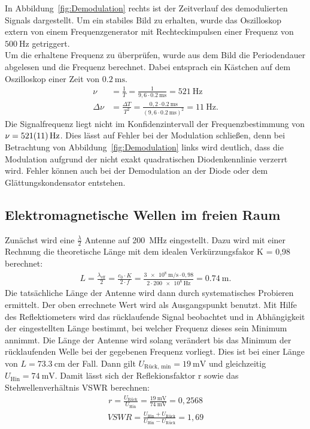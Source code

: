 \documentclass[a4paper,twoside,final]{article}
\begin{document}
In Abbildung~\ref{fig:Demodulation} rechts ist der Zeitverlauf des demodulierten Signals dargestellt. Um ein stabiles Bild zu erhalten, wurde das Oszilloskop extern von einem Frequenzgenerator mit Rechteckimpulsen einer Frequenz von $\SI{500}{\hertz}$ getriggert.\\
Um die erhaltene Frequenz zu überprüfen, wurde aus dem Bild die Periodendauer abgelesen und die Frequenz berechnet. Dabei entsprach ein Kästchen auf dem Oszilloskop einer Zeit von $\SI{0,2}{\milli\second}$.
\begin{align}
  \nu &= \frac{1}{T} = \frac{1}{9,6\cdot \SI{0,2}{\milli\second}} = \SI{521}{\hertz}\\
  \Delta \nu &= \frac{\Delta T}{T^2} = \frac{0,2\cdot \SI{0,2}{\milli\second}}{(9,6\cdot \SI{0,2}{\milli\second})^2} = \SI{11}{\hertz}.
\end{align}
Die Signalfrequenz liegt nicht im Konfidenzintervall der Frequenzbestimmung von $\nu = \SI{521\pm 11}{\hertz}$. Dies lässt auf Fehler bei der Modulation schließen, denn bei Betrachtung von Abbildung~\ref{fig:Demodulation} links wird deutlich, dass die Modulation aufgrund der nicht exakt quadratischen Diodenkennlinie verzerrt wird. Fehler können auch bei der Demodulation an der Diode oder dem Glättungskondensator entstehen.

\subsection{Elektromagnetische Wellen im freien Raum}
Zunächst wird eine $\frac{\lambda}{2}$ Antenne auf \SI{200}{\mega\hertz} eingestellt. Dazu wird mit einer Rechnung die theoretische Länge mit dem idealen Verkürzungsfakor K = 0,98 berechnet:
\begin{align}
L = \frac{\lambda_\text{eff}}{2} = \frac{c_0 \cdot K}{2 \cdot f} = \frac{\SI{3e8}{\metre\per\second} \cdot 0,98}{2 \cdot \SI{200e8}{\hertz}}  = \SI{0,74}{\metre}.
\end{align}
Die tatsächliche Länge der Antenne wird dann durch systematisches Probieren ermittelt. Der oben errechnete Wert wird als Ausgangspunkt benutzt. Mit Hilfe des Reflektiometers wird das rücklaufende Signal beobachtet und in Abhängigkeit der eingestellten Länge bestimmt, bei welcher Frequenz dieses sein Minimum annimmt. Die Länge der Antenne wird solang verändert bis das Minimum der rücklaufenden Welle bei der gegebenen Frequenz vorliegt. Dies ist bei einer Länge von $L = \SI{73,3}{\centi\metre}$ der Fall. Dann gilt $U_\text{Rück, min} = \SI{19}{\milli\volt}$ und gleichzeitig $U_\text{Hin} = \SI{74}{\milli\volt}$. Damit lässt sich der Reflekionsfaktor r sowie das Stehwellenverhältnis VSWR berechnen:
\begin{align}
r = \frac{U_\text{Rück}}{U_\text{Hin}} = \frac{\SI{19}{\milli\volt}}{\SI{74}{\milli\volt}} = 0,2568
\end{align}
\begin{align}
VSWR = \frac{U_\text{Hin}+U_\text{Rück}}{U_\text{Hin}-U_\text{Rück}} = 1,69
\end{align}
\end{document}
